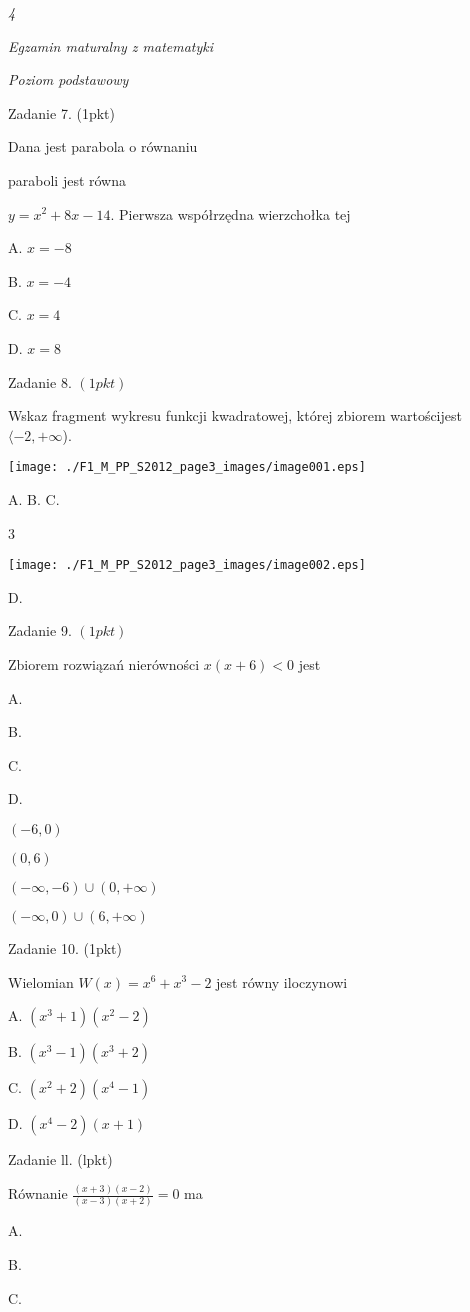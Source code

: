 \documentclass[a4paper,12pt]{article}
\begin{document}
{\it 4}

{\it Egzamin maturalny z matematyki}

{\it Poziom podstawowy}

Zadanie 7. (1pkt)

Dana jest parabola o równaniu

paraboli jest równa

$y=x^{2}+8x-14$. Pierwsza współrzędna wierzchołka tej

A. $x=-8$

B. $x=-4$

C. $x=4$

D. $x=8$

Zadanie 8. $(1pkt)$

Wskaz fragment wykresu funkcji kwadratowej, której zbiorem wartościjest $\langle-2,+\infty$).
\begin{center}
\texttt{[image: ./F1\_M\_PP\_S2012\_page3\_images/image001.eps]}
\end{center}
A.  B.  C.

3
\begin{center}
\texttt{[image: ./F1\_M\_PP\_S2012\_page3\_images/image002.eps]}
\end{center}
D.

Zadanie 9. $(1pkt)$

Zbiorem rozwiązań nierówności $x(x+6)<0$ jest

A.

B.

C.

D.

$(-6,0)$

$(0,6)$

$(-\infty,-6)\cup(0,+\infty)$

$(-\infty,0)\cup(6,+\infty)$

Zadanie 10. (1pkt)

Wielomian $W(x)=x^{6}+x^{3}-2$ jest równy iloczynowi

A. $(x^{3}+1)(x^{2}-2)$

B. $(x^{3}-1)(x^{3}+2)$

C. $(x^{2}+2)(x^{4}-1)$

D. $(x^{4}-2)(x+1)$

Zadanie ll. (lpkt)

Równanie $\displaystyle \frac{(x+3)(x-2)}{(x-3)(x+2)}=0$ ma

A.

B.

C.
\end{document}
